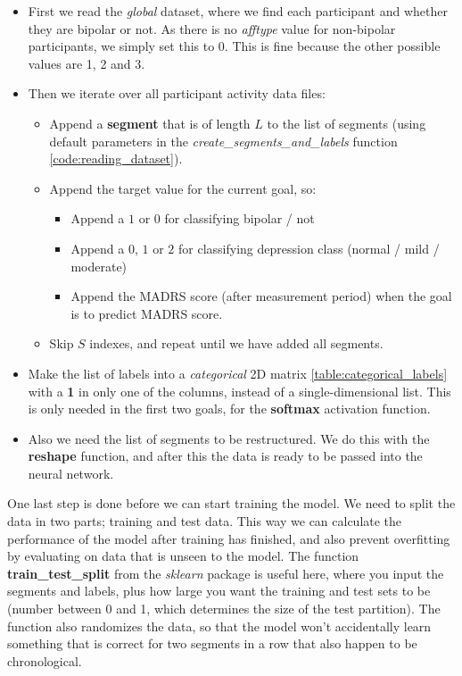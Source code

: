 \begin{itemize}
  \item First we read the \textit{global} dataset, where we find each participant and whether they are bipolar or not. As there is no \textit{afftype} value
        for non-bipolar participants, we simply set this to 0. This is fine because the other possible values are 1, 2 and 3.
  \item Then we iterate over all participant activity data files:
  \begin{itemize}
    \item Append a \textbf{segment} that is of length $L$ to the list of segments (using default parameters in the
          \textit{create\_segments\_and\_labels} function \ref{code:reading_dataset}).
    \item Append the target value for the current goal, so:
      \begin{itemize}
            \item Append a $1$ or $0$ for classifying bipolar / not
            \item Append a $0$, $1$ or $2$ for classifying depression class (normal / mild / moderate)
            \item Append the MADRS score (after measurement period) when the goal is to predict MADRS score.
      \end{itemize}  
    \item Skip $S$ indexes, and repeat until we have added all segments.
  \end{itemize}
  \item Make the list of labels into a \textit{categorical} 2D matrix \ref{table:categorical_labels} with a \textbf{1} in only one of the columns,
        instead of a single-dimensional list.
        This is only needed in the first two goals, for the \textbf{softmax} activation function.
  \item Also we need the list of segments to be restructured. We do this with the \textbf{reshape} function, 
        and after this the data is ready to be passed into the neural network.
\end{itemize}

\noindent One last step is done before we can start training the model. We need to split the data in two parts; training and test data. This way we can calculate 
the performance of the model after training has finished, and also prevent overfitting by evaluating on data that is unseen to the model. 
The function \textbf{train\_test\_split} from the \textit{sklearn} package is useful here, where you input the segments and labels, 
plus how large you want the training and test sets to be (number between 0 and 1, which determines the size of the 
test partition). The function also randomizes the data, so that the model won't accidentally learn something that is correct for two segments in a row that 
also happen to be chronological.

